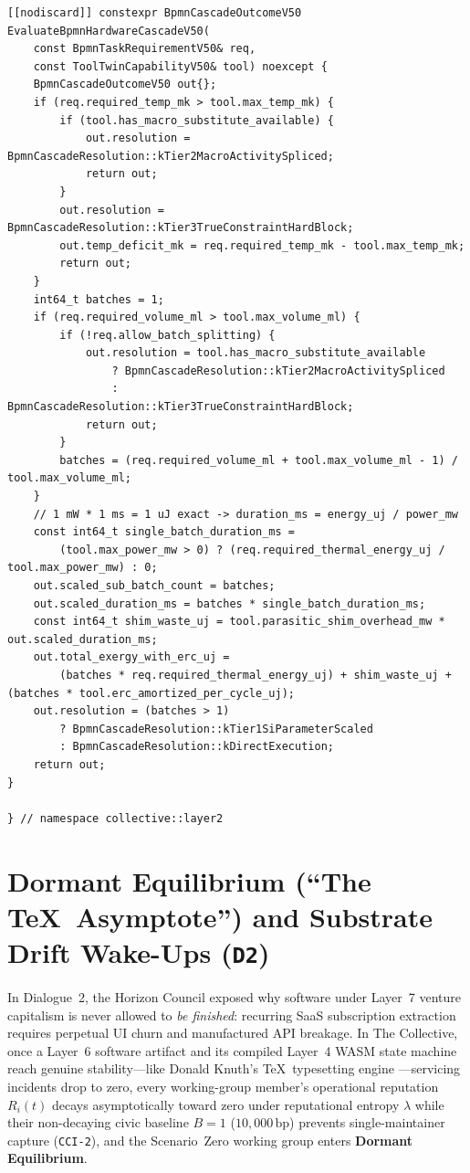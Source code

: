 \begin{lstlisting}
[[nodiscard]] constexpr BpmnCascadeOutcomeV50 EvaluateBpmnHardwareCascadeV50(
    const BpmnTaskRequirementV50& req,
    const ToolTwinCapabilityV50& tool) noexcept {
    BpmnCascadeOutcomeV50 out{};
    if (req.required_temp_mk > tool.max_temp_mk) {
        if (tool.has_macro_substitute_available) {
            out.resolution = BpmnCascadeResolution::kTier2MacroActivitySpliced;
            return out;
        }
        out.resolution = BpmnCascadeResolution::kTier3TrueConstraintHardBlock;
        out.temp_deficit_mk = req.required_temp_mk - tool.max_temp_mk;
        return out;
    }
    int64_t batches = 1;
    if (req.required_volume_ml > tool.max_volume_ml) {
        if (!req.allow_batch_splitting) {
            out.resolution = tool.has_macro_substitute_available
                ? BpmnCascadeResolution::kTier2MacroActivitySpliced
                : BpmnCascadeResolution::kTier3TrueConstraintHardBlock;
            return out;
        }
        batches = (req.required_volume_ml + tool.max_volume_ml - 1) / tool.max_volume_ml;
    }
    // 1 mW * 1 ms = 1 uJ exact -> duration_ms = energy_uj / power_mw
    const int64_t single_batch_duration_ms =
        (tool.max_power_mw > 0) ? (req.required_thermal_energy_uj / tool.max_power_mw) : 0;
    out.scaled_sub_batch_count = batches;
    out.scaled_duration_ms = batches * single_batch_duration_ms;
    const int64_t shim_waste_uj = tool.parasitic_shim_overhead_mw * out.scaled_duration_ms;
    out.total_exergy_with_erc_uj =
        (batches * req.required_thermal_energy_uj) + shim_waste_uj + (batches * tool.erc_amortized_per_cycle_uj);
    out.resolution = (batches > 1)
        ? BpmnCascadeResolution::kTier1SiParameterScaled
        : BpmnCascadeResolution::kDirectExecution;
    return out;
}

} // namespace collective::layer2
\end{lstlisting}

\section{Dormant Equilibrium (``The \TeX\ Asymptote'') and Substrate Drift Wake-Ups (\texttt{D2})}
\label{sec:l2-substrate-drift-wakeup}

In Dialogue~2, the Horizon Council exposed why software under Layer~7 venture capitalism is never allowed to \textit{be finished}: recurring SaaS subscription extraction requires perpetual UI churn and manufactured API breakage. In The Collective, once a Layer~6 software artifact and its compiled Layer~4 WASM state machine reach genuine stability---like Donald Knuth's \TeX\ typesetting engine \parencite{knuth1984texbook}---servicing incidents drop to zero, every working-group member's operational reputation $R_i(t)$ decays asymptotically toward zero under reputational entropy $\lambda$ while their non-decaying civic baseline $B = 1$ ($10{,}000\,\mathrm{bp}$) prevents single-maintainer capture (\texttt{CCI-2}), and the Scenario~Zero working group enters \textbf{Dormant Equilibrium}.

